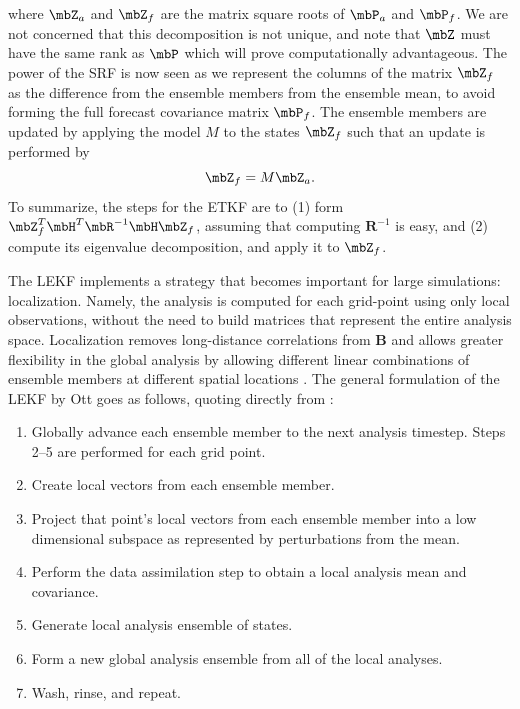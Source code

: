 where $\mbZ_a$ and $\mbZ_f$ are the matrix square roots of $\mbP_a$ and $\mbP_f$.
We are not concerned that this decomposition is not unique, and note that $\mbZ$ must have the same rank as $\mbP$ which will prove computationally advantageous.
The power of the SRF is now seen as we represent the columns of the matrix $\mbZ_f$ as the difference from the ensemble members from the ensemble mean, to avoid forming the full forecast covariance matrix $\mbP_f$.
The ensemble members are updated by applying the model $M$ to the states $\mbZ_f$ such that an update is performed by
\begin{equation} \mbZ_f = M \mbZ_a .\end{equation}
To summarize, the steps for the ETKF are to (1) form $\mbZ_f^T\mbH^T\mbR^{-1}\mbH\mbZ_f$, assuming that computing $\mathbf{R}^{-1}$ is easy, and (2) compute its eigenvalue decomposition, and apply it to $\mbZ_f$.

The LEKF implements a strategy that becomes important for large simulations: localization.
Namely, the analysis is computed for each grid-point using only local observations, without the need to build matrices that represent the entire analysis space.
Localization removes long-distance correlations from $\mathbf{B}$ and allows greater flexibility in the global analysis by allowing different linear combinations of ensemble members at different spatial locations \cite{kalnay20074}.
The general formulation of the LEKF by Ott goes as follows, quoting directly from \cite{ott2004local}:
\begin{enumerate}
\item Globally advance each ensemble member to the next analysis timestep. Steps 2--5 are performed for each grid point.
\item Create local vectors from each ensemble member.
\item Project that point's local vectors from each ensemble member into a low dimensional subspace as represented by perturbations from the mean.
\item Perform the data assimilation step to obtain a local analysis mean and covariance.
\item Generate local analysis ensemble of states.
\item Form a new global analysis ensemble from all of the local analyses.
\item Wash, rinse, and repeat.
\end{enumerate}

